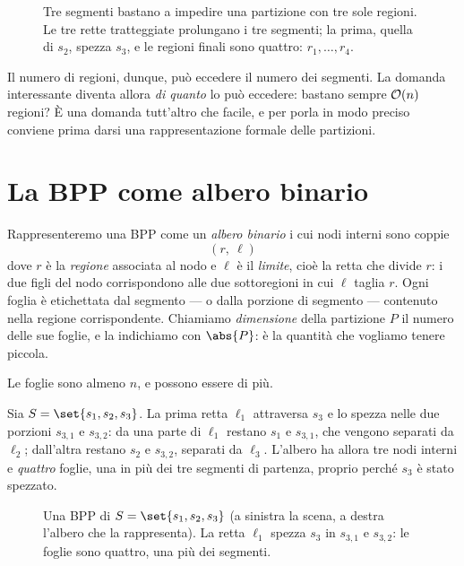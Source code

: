 \begin{figure}[H]
\centering

\caption{Tre segmenti bastano a impedire una partizione con tre sole regioni. Le tre rette
tratteggiate prolungano i tre segmenti; la prima, quella di $s_2$, spezza $s_3$, e le
regioni finali sono quattro: $r_1,\dots,r_4$.}
\end{figure}

Il numero di regioni, dunque, può eccedere il numero dei segmenti. La domanda interessante
diventa allora \emph{di quanto} lo può eccedere: bastano sempre $\mathcal{O}(n)$ regioni? È una
domanda tutt'altro che facile, e per porla in modo preciso conviene prima darsi una
rappresentazione formale delle partizioni.

\section{La BPP come albero binario}


Rappresenteremo una BPP come un \emph{albero binario} i cui nodi interni sono coppie
\[
  (r,\ \ell)
\]
dove $r$ è la \emph{regione} associata al nodo e $\ell$ è il \emph{limite}, cioè la retta
che divide $r$: i due figli del nodo corrispondono alle due sottoregioni in cui $\ell$ taglia
$r$. Ogni foglia è etichettata dal segmento — o dalla porzione di segmento — contenuto nella
regione corrispondente. Chiamiamo \emph{dimensione} della partizione $P$ il numero delle sue
foglie, e la indichiamo con $\abs{P}$: è la quantità che vogliamo tenere piccola.

Le foglie sono almeno $n$, e possono essere di più.

\begin{esempio}
Sia $S=\set{s_1,s_2,s_3}$. La prima retta $\ell_1$ attraversa $s_3$ e lo spezza nelle due
porzioni $s_{3,1}$ e $s_{3,2}$: da una parte di $\ell_1$ restano $s_1$ e $s_{3,1}$, che
vengono separati da $\ell_2$; dall'altra restano $s_2$ e $s_{3,2}$, separati da $\ell_3$.
L'albero ha allora tre nodi interni e \emph{quattro} foglie, una in più dei tre segmenti di
partenza, proprio perché $s_3$ è stato spezzato.

\begin{figure}[H]
\centering

\caption{Una BPP di $S=\set{s_1,s_2,s_3}$ (a sinistra la scena, a destra l'albero che la
rappresenta). La retta $\ell_1$ spezza $s_3$ in $s_{3,1}$ e $s_{3,2}$: le foglie sono
quattro, una più dei segmenti.}
\end{figure}
\end{esempio}

